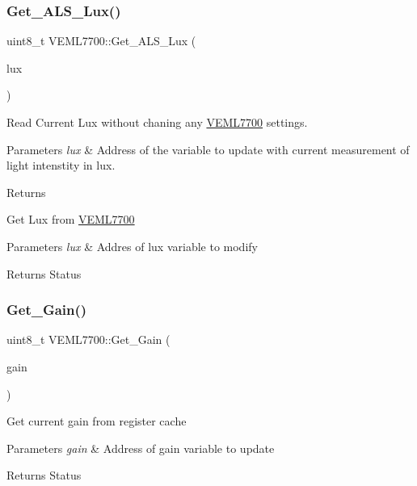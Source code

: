 \subsubsection{\texorpdfstring{Get\+\_\+\+A\+L\+S\+\_\+\+Lux()}{Get\_ALS\_Lux()}}
{\footnotesize\ttfamily uint8\+\_\+t V\+E\+M\+L7700\+::\+Get\+\_\+\+A\+L\+S\+\_\+\+Lux (\begin{DoxyParamCaption}\item[{float \&}]{lux }\end{DoxyParamCaption})}

Read Current Lux without chaning any \hyperlink{classVEML7700}{V\+E\+M\+L7700} settings.


\begin{DoxyParams}{Parameters}
{\em lux} & Address of the variable to update with current measurement of light intenstity in lux.\\
\hline
\end{DoxyParams}
\begin{DoxyReturn}{Returns}

\end{DoxyReturn}
Get Lux from \hyperlink{classVEML7700}{V\+E\+M\+L7700}


\begin{DoxyParams}{Parameters}
{\em lux} & Addres of lux variable to modify\\
\hline
\end{DoxyParams}
\begin{DoxyReturn}{Returns}
Status 
\end{DoxyReturn}
\mbox{\label{classVEML7700_a127d85c25f32b5bc0282fb04ad813fd6}} 
\subsubsection{\texorpdfstring{Get\+\_\+\+Gain()}{Get\_Gain()}}
{\footnotesize\ttfamily uint8\+\_\+t V\+E\+M\+L7700\+::\+Get\+\_\+\+Gain (\begin{DoxyParamCaption}\item[{\hyperlink{classVEML7700_a7328cc2563da545e48ea72381dc7bd9b}{A\+L\+S\+\_\+\+G\+A\+I\+N\+\_\+T} \&}]{gain }\end{DoxyParamCaption})}

Get current gain from register cache


\begin{DoxyParams}{Parameters}
{\em gain} & Address of gain variable to update\\
\hline
\end{DoxyParams}
\begin{DoxyReturn}{Returns}
Status 
\end{DoxyReturn}
\mbox{\label{classVEML7700_a226efafb0bbc8068fbdf02f2d0afc0a0}} 
